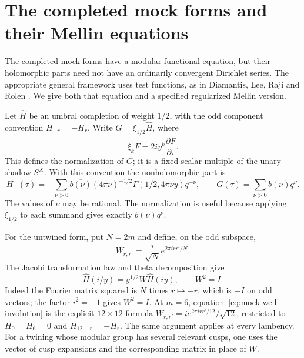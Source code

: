 \section{The completed mock forms and their Mellin equations}
\label{sec:mock-mellin}
The completed mock forms have a modular functional equation, but their
holomorphic parts need not have an ordinarily convergent Dirichlet series.
The appropriate general framework uses test functions, as in Diamantis,
Lee, Raji and Rolen \cite[Definition~4.2, Lemma~4.4 and Theorem~4.5]{DLRR2023}.
We give both that equation and a specified regularized Mellin version.

Let $\widehat H$ be an umbral completion of weight $1/2$, with the odd
component convention $H_{-r}=-H_r$.  Write $G=\xi_{1/2}\widehat H$, where
\[
 \xi_kF=2iy^k\overline{\frac{\partial F}{\partial\bar\tau}}.
\]
This defines the normalization of $G$; it is a fixed scalar multiple of the
unary shadow $S^X$.  With this convention the nonholomorphic part is
\begin{equation}\label{eq:mock-nonholomorphic-part}
 H^-(\tau)=-\sum_{\nu>0}\overline{b(\nu)}(4\pi\nu)^{-1/2}
       \Gamma(1/2,4\pi\nu y)q^{-\nu},
 \qquad G(\tau)=\sum_{\nu>0}b(\nu)q^\nu.
\end{equation}
The values of $\nu$ may be rational.  The normalization is useful because
applying $\xi_{1/2}$ to each summand gives exactly $b(\nu)q^\nu$.

For the untwined form, put $N=2m$ and define, on the odd subspace,
\begin{equation}\label{eq:mock-weil-involution}
 W_{r,r'}=\frac{i}{\sqrt N}e^{2\pi irr'/N}.
\end{equation}
The Jacobi transformation law and theta decomposition give
\begin{equation}\label{eq:mock-axis-transformation}
 \widehat H(i/y)=y^{1/2}W\widehat H(iy),\qquad W^2=I.
\end{equation}
Indeed the Fourier matrix squared is $N$ times $r\mapsto-r$, which is
$-I$ on odd vectors; the factor $i^2=-1$ gives $W^2=I$.
At $m=6$, equation~\eqref{eq:mock-weil-involution} is the explicit
$12\times12$ formula $W_{r,r'}=i e^{2\pi irr'/12}/\sqrt{12}$,
restricted to $H_0=H_6=0$ and $H_{12-r}=-H_r$.
The same argument applies at every lambency.  For a twining whose modular
group has several relevant cusps, one uses the vector of cusp expansions
and the corresponding matrix in place of $W$.

